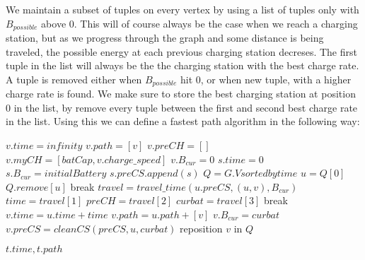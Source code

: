We maintain a subset of tuples on every vertex by using a list of tuples only with $B_{possible}$ above 0. This will of course always be the case when we reach a charging station, but as we progress through the graph and some distance is being traveled, the possible energy at each previous charging station decreses. The first tuple in the list will always be the the charging station with the best charge rate. A tuple is removed either when $B_{possible}$ hit 0, or when new tuple, with a higher charge rate is found. We make sure to store the best charging station at position 0 in the list, by remove every tuple between the first and second best charge rate in the list. Using this we can define a fastest path algorithm in the following way: 

\begin{algorithmic}
    		\State $v.time = infinity$
		\State $v.path = [v]$
    		\State $v.preCH = []$
		\State $v.myCH = [batCap, v.charge\_speed]$
		\State $v.B_{cur} = 0$
    	\EndFor
	\State $s.time = 0$
	\State $s.B_{cur} = initialBattery$
	\State $s.preCS.append(s)$	
	\State $Q = G.V sorted by time$
		\State $u = Q[0]$
		\State $Q.remove[u]$
		 break \EndIf
			\State $travel = travel\_time(u.preCS, (u, v), B_{cur})$
			\State $time = travel[1]$
			\State $preCH = travel[2]$
			\State $curbat = travel[3]$
			 break \EndIf
				\State $v.time = u.time + time$
				\State $v.path = u.path + [v]$
				\State $v.B_{cur} = curbat$
				\State $v.preCS = cleanCS(preCS, u, curbat)$
				\State reposition $v$ in $Q$
			\EndIf

		\EndFor
	\EndWhile
	\State \Return $t.time, t.path$
\EndFunction
\end{algorithmic}\label{alg:fastest_path}
